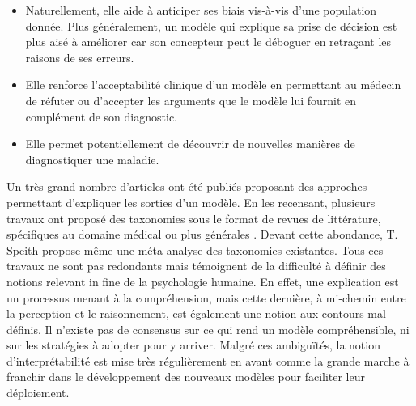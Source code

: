 \begin{itemize}
	\item Naturellement, elle aide à anticiper ses biais vis-à-vis d'une population donnée. Plus généralement, un modèle qui explique sa prise de décision est plus aisé à améliorer car son concepteur peut le déboguer en retraçant les raisons de ses erreurs.
	\item Elle renforce l'acceptabilité clinique d'un modèle en permettant au médecin de réfuter ou d'accepter les arguments que le modèle lui fournit en complément de son diagnostic.
	\item Elle permet potentiellement de découvrir de nouvelles manières de diagnostiquer une maladie.
\end{itemize}
Un très grand nombre d'articles ont été publiés proposant des approches permettant d'expliquer les sorties d'un modèle. En les recensant, plusieurs travaux ont proposé des taxonomies sous le format de revues de littérature, spécifiques au domaine médical \cite{messinaSurveyDeepLearning2022, tjoaSurveyExplainableArtificial2021a, groenSystematicReviewUse2022, holzingerCausabilityExplainabilityArtificial2019, joyceExplainableArtificialIntelligence2023, jinExplainableDeepLearning2022, patricioExplainableDeepLearning2022, singhExplainableDeepLearning2020, rasheedExplainableTrustworthyEthical2022, petchOpeningBlackBox2022, barragan-monteroSafeEfficientClinical2022, salahuddinTransparencyDeepNeural2022} ou plus générales \cite{mohseniMultidisciplinarySurveyFramework2021, joshiReviewExplainabilityMultimodal2021, burkartSurveyExplainabilitySupervised2021a, doshi-velezConsiderationsEvaluationGeneralization2018, dwivediExplainableAIXAI2023}. Devant cette abondance, T. Speith \cite{speithReviewTaxonomiesExplainable2022} propose même une méta-analyse des taxonomies existantes. Tous ces travaux ne sont pas redondants mais témoignent de la difficulté à définir des notions relevant in fine de la psychologie humaine. En effet, une explication est un processus menant à la compréhension, mais cette dernière, à mi-chemin entre la perception et le raisonnement, est également une notion aux contours mal définis. Il n'existe pas de consensus sur ce qui rend un modèle compréhensible, ni sur les stratégies à adopter pour y arriver. Malgré ces ambiguïtés, la notion d'interprétabilité est mise très régulièrement en avant comme la grande marche à franchir dans le développement des nouveaux modèles pour faciliter leur déploiement.


